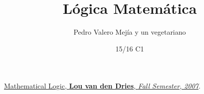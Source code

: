 \documentclass[nochap]{apuntes}
\title{Lógica Matemática}
\author{Pedro Valero Mejía y un vegetariano}
\date{15/16 C1}
\begin{document}
\pagestyle{plain}
\maketitle

\tableofcontents
\newpage






\appendix









\newpage
\begin{thebibliography}{}

	\href{http://www.math.uiuc.edu/~henson/Math570/Fall2009/Math570notes.pdf}{Mathematical Logic,
	\textbf{Lou van den Dries},
	\emph{Fall Semester,
	2007}}.

\end{thebibliography}

\printindex
\end{document}
